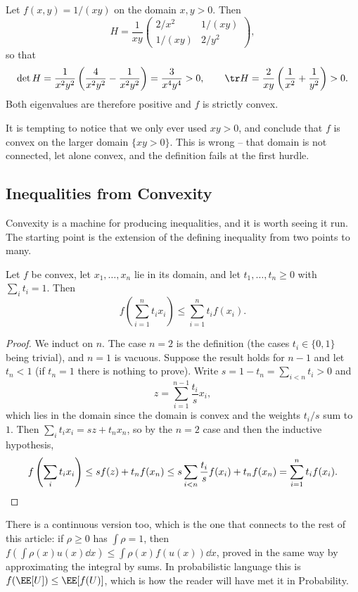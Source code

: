 \begin{example}
	Let $f(x, y) = 1/(xy)$ on the domain $x, y > 0$. Then
	$$
	H = \frac{1}{xy}\begin{pmatrix}
		2/x^2 & 1/(xy) \\ 1/(xy) & 2/y^2
	\end{pmatrix},
	$$
	so that
	$$
	\det H = \frac{1}{x^2y^2}\left(\frac{4}{x^2y^2} - \frac{1}{x^2y^2}\right) = \frac{3}{x^4 y^4} > 0, \qquad \tr H = \frac{2}{xy}\left(\frac{1}{x^2} + \frac{1}{y^2}\right) > 0.
	$$
	Both eigenvalues are therefore positive and $f$ is strictly convex.

	It is tempting to notice that we only ever used $xy > 0$, and conclude that $f$ is convex on the larger domain $\{xy > 0\}$. This is wrong -- that domain is not connected, let alone convex, and the definition fails at the first hurdle.
\end{example}

\subsection{Inequalities from Convexity}

Convexity is a machine for producing inequalities, and it is worth seeing it run. The starting point is the extension of the defining inequality from two points to many.

\begin{theorem}
	Let $f$ be convex, let $x_1, \dots, x_n$ lie in its domain, and let $t_1, \dots, t_n \geq 0$ with $\sum_i t_i = 1$. Then
	$$
	f\left(\sum_{i=1}^n t_i x_i\right) \leq \sum_{i = 1}^n t_i f(x_i).
	$$
\end{theorem}
\begin{proof}
	We induct on $n$. The case $n = 2$ is the definition (the cases $t_i \in \{0,1\}$ being trivial), and $n = 1$ is vacuous. Suppose the result holds for $n - 1$ and let $t_n < 1$ (if $t_n = 1$ there is nothing to prove). Write $s = 1 - t_n = \sum_{i < n} t_i > 0$ and
	$$
	z = \sum_{i = 1}^{n-1}\frac{t_i}{s}x_i,
	$$
	which lies in the domain since the domain is convex and the weights $t_i/s$ sum to $1$. Then $\sum_i t_i x_i = sz + t_n x_n$, so by the $n = 2$ case and then the inductive hypothesis,
	\[
	f\left(\sum_i t_i x_i\right) \leq s f(z) + t_n f(x_n) \leq s \sum_{i<n} \frac{t_i}{s}f(x_i) + t_n f(x_n) = \sum_{i=1}^n t_i f(x_i). \qedhere
	\]
\end{proof}

There is a continuous version too, which is the one that connects to the rest of this article: if $\rho \geq 0$ has $\int \rho = 1$, then $f\left(\int \rho(x) u(x) \dd x\right) \leq \int \rho(x) f(u(x)) \dd x$, proved in the same way by approximating the integral by sums. In probabilistic language this is $f(\EE[U]) \leq \EE[f(U)]$, which is how the reader will have met it in Probability.

